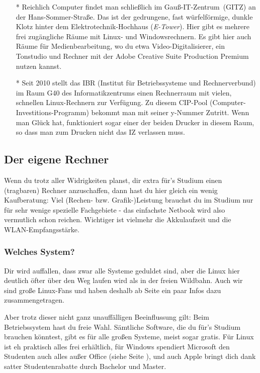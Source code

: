 {\begin{itemize}
				\item[*] Reichlich Computer findet man schließlich im Gauß-IT-Zentrum~(GITZ) an der Hans-Sommer-Straße. Das ist der gedrungene, fast würfelförmige, dunkle Klotz hinter dem Elektrotechnik-Hochhaus (\emph{E-Tower}). Hier gibt es mehrere frei zugängliche Räume mit  Linux- und Windowsrechnern. Es gibt hier auch Räume für Medienbearbeitung, wo du etwa Video-Digitalisierer, ein Tonstudio und Rechner mit der Adobe Creative Suite Production Premium nutzen kannst.

				\item[*] Seit 2010 stellt das IBR (Institut für Betriebssysteme und Rechnerverbund) im Raum G40 des Informatikzentrums einen Rechnerraum mit vielen, schnellen Linux-Rechnern  zur Verfügung. Zu diesem CIP-Pool (Computer-Investitions-Programm) bekommt man mit seiner y-Nummer Zutritt. Wenn man Glück hat, funktioniert sogar einer der beiden Drucker in diesem Raum, so dass man zum Drucken nicht das IZ verlassen muss.
			\end{itemize}

		\subsection{Der eigene Rechner}
			Wenn du trotz aller Widrigkeiten planst, dir
			extra für's Studium einen (tragbaren) Rechner
			anzuschaffen, dann hast du hier gleich ein wenig
			Kaufberatung: Viel (Rechen- bzw.
			Grafik-)Leistung brauchst du im Studium  nur für
			sehr wenige spezielle Fachgebiete - das
			einfachste Netbook wird also vermutlich schon
			reichen. Wichtiger ist vielmehr die Akkulaufzeit
			und die WLAN-Empfangsstärke. %

		\subsubsection{Welches System?}
			Dir wird auffallen, dass zwar alle Systeme geduldet sind, aber die Linux hier deutlich öfter über den Weg laufen wird als in der freien Wildbahn. Auch wir sind große Linux-Fans und haben deshalb ab Seite \pageref{linux} ein paar Infos dazu zusammengetragen.

			Aber trotz dieser nicht ganz unauffälligen Beeinflussung gilt: Beim Betriebssystem hast du freie Wahl. Sämtliche Software, die du für's Studium brauchen  könntest, gibt es für alle großen Systeme, meist sogar gratis. Für Linux ist eh  praktisch alles frei erhältlich, für Windows spendiert Microsoft den Studenten auch alles außer Office (siehe Seite \pageref{msdnaa}), und auch Apple bringt dich dank satter Studentenrabatte durch Bachelor und Master. 

}
